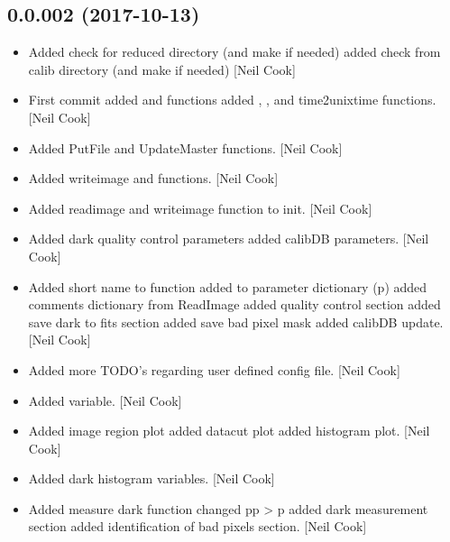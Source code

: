 \documentclass[a4paper,10pt,english]{report}
\begin{document}
\subsection{0.0.002 (2017-10-13)}
\label{\detokenize{misc/changelog:id549}}\begin{itemize}
\item {} 
Added check for reduced directory (and make if needed) added check
from calib directory (and make if needed) {[}Neil Cook{]}

\item {} 
First commit added  and  functions added
, , and time2unixtime
functions. {[}Neil Cook{]}

\item {} 
Added PutFile and UpdateMaster functions. {[}Neil Cook{]}

\item {} 
Added writeimage and  functions. {[}Neil Cook{]}

\item {} 
Added readimage and writeimage function to init. {[}Neil Cook{]}

\item {} 
Added dark quality control parameters added calibDB parameters. {[}Neil
Cook{]}

\item {} 
Added short name to  function added  to
parameter dictionary (p) added comments dictionary from ReadImage
added quality control section added save dark to fits section added
save bad pixel mask added calibDB update. {[}Neil Cook{]}

\item {} 
Added more TODO’s regarding user defined config file. {[}Neil Cook{]}

\item {} 
Added  variable. {[}Neil Cook{]}

\item {} 
Added image region plot added datacut plot added histogram plot. {[}Neil
Cook{]}

\item {} 
Added dark histogram variables. {[}Neil Cook{]}

\item {} 
Added measure dark function changed pp \textendash{}\textgreater{} p added dark measurement
section added identification of bad pixels section. {[}Neil Cook{]}

\end{itemize}
\end{document}
